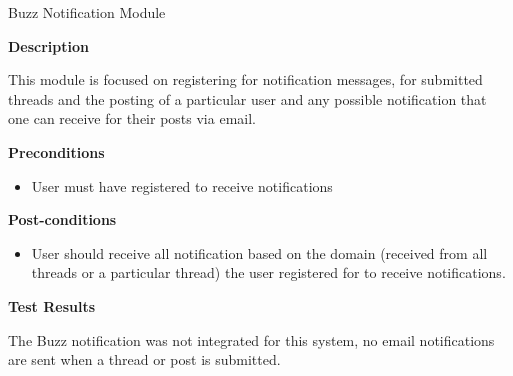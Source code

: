 \item Buzz Notification Module

\textbf{Description}

This module is focused on registering for notification messages, for submitted threads and the posting of a particular user and any possible notification that one can receive for their posts via email.
 	
\textbf{Preconditions}
\begin{itemize}
	\item User must have registered to receive notifications 
\end{itemize}

\textbf{Post-conditions}
\begin{itemize}
\item User should receive all notification based on the domain (received from all threads or a particular thread) the user registered for to receive notifications.   
\end{itemize}

\textbf{Test Results}

The Buzz notification was not integrated for this system, no email notifications are sent when a thread or post is submitted. 